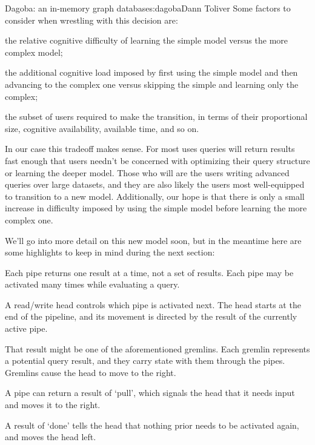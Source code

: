 \begin{aosachapter}{Dagoba: an in-memory graph database}{s:dagoba}{Dann Toliver}
Some factors to consider when wrestling with this decision are:

\begin{aosaitemize}

\item
  the relative cognitive difficulty of learning the simple model versus
  the more complex model;
\item
  the additional cognitive load imposed by first using the simple model
  and then advancing to the complex one versus skipping the simple and
  learning only the complex;
\item
  the subset of users required to make the transition, in terms of their
  proportional size, cognitive availability, available time, and so on.
\end{aosaitemize}

In our case this tradeoff makes sense. For most uses queries will return
results fast enough that users needn't be concerned with optimizing
their query structure or learning the deeper model. Those who will are
the users writing advanced queries over large datasets, and they are
also likely the users most well-equipped to transition to a new model.
Additionally, our hope is that there is only a small increase in
difficulty imposed by using the simple model before learning the more
complex one.

We'll go into more detail on this new model soon, but in the meantime
here are some highlights to keep in mind during the next section:

\begin{aosaitemize}

\item
  Each pipe returns one result at a time, not a set of results. Each
  pipe may be activated many times while evaluating a query.
\item
  A read/write head controls which pipe is activated next. The head
  starts at the end of the pipeline, and its movement is directed by the
  result of the currently active pipe.
\item
  That result might be one of the aforementioned gremlins. Each gremlin
  represents a potential query result, and they carry state with them
  through the pipes. Gremlins cause the head to move to the right.
\item
  A pipe can return a result of `pull', which signals the head that it
  needs input and moves it to the right.
\item
  A result of `done' tells the head that nothing prior needs to be
  activated again, and moves the head left.
\end{aosaitemize}


\end{aosachapter}

